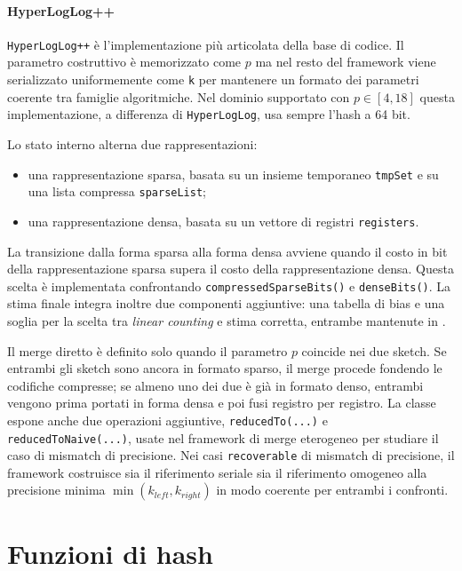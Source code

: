 \paragraph{HyperLogLog++}
\texttt{HyperLogLog++} è l'implementazione più articolata della base di codice.
Il parametro costruttivo è memorizzato come \(p\) ma nel resto del framework viene
serializzato uniformemente come \texttt{k} per mantenere un formato dei
parametri coerente tra famiglie algoritmiche. Nel dominio supportato con
\(p \in [4,18]\) questa implementazione, a differenza di \texttt{HyperLogLog},
usa sempre l'hash a 64 bit.

Lo stato interno alterna due rappresentazioni:
\begin{itemize}
    \item una rappresentazione sparsa, basata su un insieme temporaneo
    \texttt{tmpSet} e su una lista compressa \texttt{sparseList};
    \item una rappresentazione densa, basata su un vettore di registri
    \texttt{registers}.
\end{itemize}

La transizione dalla forma sparsa alla forma densa avviene quando il costo in
bit della rappresentazione sparsa supera il costo della rappresentazione densa.
Questa scelta è implementata confrontando \texttt{compressedSparseBits()} e
\texttt{denseBits()}. La stima finale integra inoltre due componenti aggiuntive:
una tabella di bias e una soglia per la scelta tra \emph{linear counting} e
stima corretta, entrambe mantenute in .

Il merge diretto è definito solo quando il parametro \(p\) coincide nei due
sketch. Se entrambi gli sketch sono ancora in formato sparso, il merge procede
fondendo le codifiche compresse; se almeno uno dei due è già in formato denso,
entrambi vengono prima portati in forma densa e poi fusi registro per registro.
La classe espone anche due operazioni aggiuntive, \texttt{reducedTo(...)} e
\texttt{reducedToNaive(...)}, usate nel framework di merge eterogeneo per
studiare il caso di mismatch di precisione. Nei casi \texttt{recoverable} di
mismatch di precisione, il framework costruisce sia il riferimento seriale sia
il riferimento omogeneo alla precisione minima \(\min(k_{left}, k_{right})\) in
modo coerente per entrambi i confronti.

\section{Funzioni di hash}

